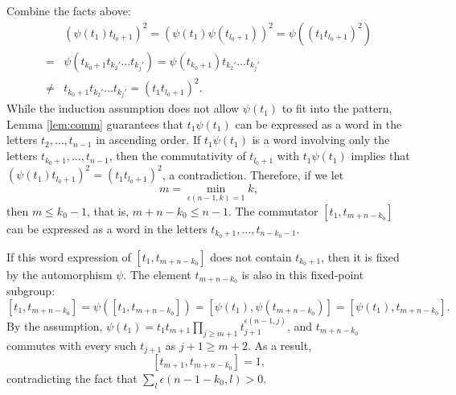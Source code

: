\documentclass[12pt,leqno]{amsart}
\makeatletter
\renewenvironment{proof}[1][\proofname]{%
	\par
	\pushQED{\qed}%
	\normalfont
	\topsep6\p@\@plus6\p@\relax
	\trivlist
	\item[\hskip\labelsep\itshape #1\@addpunct{.}]%
	\ignorespaces
}{%
	\par\nobreak\vspace{2pt}%
	\popQED%
	\medskip%
	\endtrivlist
	\@endpefalse
}
\newcommand{\2}{L^2_{\rm per}(0, T)}
\numberwithin{equation}{section}
\numberwithin{figure}{section}
\makeatother
\begin{document}
\begin{proof}[Proof of Theorem \ref{thm:HNN_rigidity}]
    Combine the facts above:
    \[
    \begin{split}
        & (\psi(t_1)t_{l_0+1})^2 = (\psi(t_1)\psi(t_{l_0+1}))^2 = \psi((t_1t_{l_0+1})^2) \\
        = & \psi(t_{k_0+1} t_{k_2'}\dots t_{k_j'}) = \psi(t_{k_0+1})t_{k_2'}\dots t_{k_j'} \\
        \neq & t_{k_0+1}t_{k_2'}\dots t_{k_j'} = (t_1t_{l_0+1})^2.
    \end{split}
    \]
    While the induction assumption does not allow $\psi(t_1)$ to fit into the pattern, Lemma \ref{lem:comm} guarantees that $t_1\psi(t_1)$ can be expressed as a word in the letters $t_2,\dots,t_{n-1}$ in ascending order. If $t_1\psi(t_1)$ is a word involving only the letters $t_{k_0+1},\dots,t_{n-1}$, then the commutativity of $t_{l_0+1}$ with $t_1\psi(t_1)$ implies that $(\psi(t_1)t_{l_0+1})^2 = (t_1t_{l_0+1})^2$, a contradiction. Therefore, if we let
    \[
        m = \min_{\epsilon(n-1,k)=1}k,
    \]
    then $m\leq k_0-1$, that is, $m+n-k_0\leq n-1$. The commutator $[t_1,t_{m+n-k_0}]$ can be expressed as a word in the letters $t_{k_0+1},\dots,t_{n-k_0-1}$.

    If this word expression of $[t_1,t_{m+n-k_0}]$ does not contain $t_{k_0+1}$, then it is fixed by the automorphism $\psi$. The element $t_{m+n-k_0}$ is also in this fixed-point subgroup:
    \[
        [t_1,t_{m+n-k_0}] = \psi([t_1,t_{m+n-k_0}]) = [\psi(t_1),\psi(t_{m+n-k_0})] = [\psi(t_1),t_{m+n-k_0}].
    \]
    By the assumption, $\psi(t_1) = t_1t_{m+1}\prod_{j\geq m+1}t_{j+1}^{\epsilon(n-1, j)}$, and $t_{m+n-k_0}$ commutes with every such $t_{j+1}$ as $j+1\geq m+2$. As a result,
    \[
        [t_{m+1},t_{m+n-k_0}] = 1,
    \]
    contradicting the fact that $\sum_l\epsilon(n-1-k_0,l)>0$.
    

\end{proof}
\end{document}
